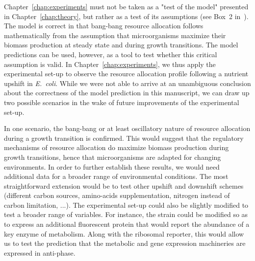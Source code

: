 Chapter~\ref{chap:experiments} must not be taken as a "test of the model" presented in Chapter~\ref{chap:theory}, but rather as a test of its assumptions (see Box~2 in~\cite{servedio_not_2014}).
The model is correct in that bang-bang resource allocation follows mathematically from the assumption that microorganisms maximize their biomass production at steady state and during growth transitions.
The model predictions can be used, however, as a tool to test whether this critical assumption is valid.
In Chapter~\ref{chap:experiments}, we thus apply the experimental set-up to observe the resource allocation profile following a nutrient upshift in \textit{E.~coli}.
While we were not able to arrive at an unambiguous conclusion about the correctness of the model prediction in this manuscript, we can draw up two possible scenarios in the wake of future improvements of the experimental set-up.

In one scenario, the bang-bang or at least oscillatory nature of resource allocation during a growth transition is confirmed.
This would suggest that the regulatory mechanisms of resource allocation do maximize biomass production during growth transitions, hence that microorganisms are adapted for changing environments.
In order to further establish these results, we would need additional data for a broader range of environmental conditions.
The most straightforward extension would be to test other upshift and downshift schemes (different carbon sources, amino-acids supplementation, nitrogen instead of carbon limitation, ...).
The experimental set-up could also be slightly modified to test a broader range of variables.
For instance, the strain could be modified so as to express an additional fluorescent protein that would report the abundance of a key enzyme of metabolism.
Along with the ribosomal reporter, this would allow us to test the prediction that the metabolic and gene expression machineries are expressed in anti-phase.

